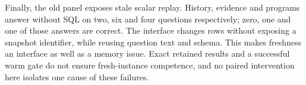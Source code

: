 Finally, the old panel exposes stale scalar replay. History, evidence and
programs answer without SQL on two, six and four questions respectively; zero,
one and one of those answers are correct. The interface changes rows without
exposing a snapshot identifier, while reusing question text and schema. This
makes freshness an interface as well as a memory issue. Exact retained results
and a successful warm gate do not ensure fresh-instance competence, and no
paired intervention here isolates one cause of these failures.

